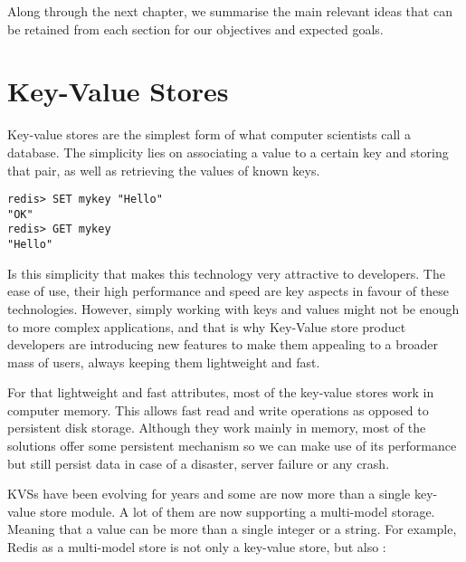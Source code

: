 Along through the next chapter, we summarise the main relevant ideas that can be retained from each section for our objectives and expected goals.

\section{Key-Value Stores} %
\label{sec:key-value_stores}

Key-value stores are the simplest form of what computer scientists call a database. The simplicity lies on associating a value to a certain key and storing that pair, as well as retrieving the values of known keys. \cite{db-engine:1}

\lstset{language=Bash, caption=Redis Set \& Get, label=lst:redisSetGet}
\begin{lstlisting}
redis> SET mykey "Hello"
"OK"
redis> GET mykey
"Hello"
\end{lstlisting}

Is this simplicity that makes this technology very attractive to developers. The ease of use, their high performance and speed are key aspects in favour of these technologies. However, simply working with keys and values might not be enough to more complex applications, and that is why Key-Value store product developers are introducing new features to make them appealing to a broader mass of users, always keeping them lightweight and fast.

For that lightweight and fast attributes, most of the key-value stores work in computer memory. This allows fast read and write operations as opposed to persistent disk storage. Although they work mainly in memory, most of the solutions offer some persistent mechanism so we can make use of its performance but still persist data in case of a disaster, server failure or any crash.

\glspl{KVS} have been evolving for years and some are now more than a single key-value store module. A lot of them are now supporting a multi-model storage. Meaning that a value can be more than a single integer or a string. For example, Redis \cite{redis:1} as a multi-model store is not only a key-value store, but also \cite{redis:2}:

